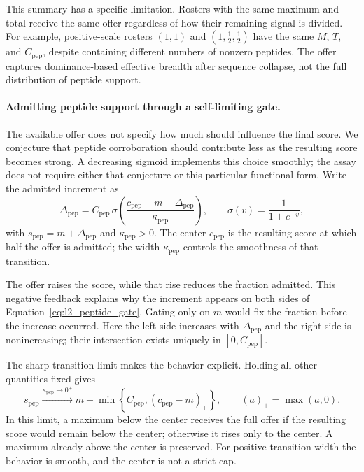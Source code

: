 \documentclass[11pt]{article}
\begin{document}
This summary has a specific limitation. Rosters with the same maximum and
total receive the same offer regardless of how their remaining signal is
divided. For example, positive-scale rosters \((1,1)\) and
\((1,\tfrac12,\tfrac12)\) have the same \(M\), \(T\), and
\(C_{\mathrm{pep}}\), despite containing different numbers of nonzero
peptides. The offer captures dominance-based effective breadth after
sequence collapse, not the full distribution of peptide support.

\paragraph{Admitting peptide support through a self-limiting gate.}
The available offer does not specify how much should influence the final
score. We conjecture that peptide corroboration should contribute less as
the resulting score becomes strong. A decreasing sigmoid implements this
choice smoothly; the assay does not require either that conjecture or this
particular functional form. Write the admitted increment as
\begin{equation}
\Delta_{\mathrm{pep}}
=C_{\mathrm{pep}}\,
\sigma\!\left(\frac{c_{\mathrm{pep}}-m-\Delta_{\mathrm{pep}}}
{\kappa_{\mathrm{pep}}}\right),
\qquad \sigma(v)=\frac{1}{1+e^{-v}},
\label{eq:l2_peptide_gate}
\end{equation}
with \(s_{\mathrm{pep}}=m+\Delta_{\mathrm{pep}}\) and
\(\kappa_{\mathrm{pep}}>0\). The center \(c_{\mathrm{pep}}\) is the
resulting score at which half the offer is admitted; the width
\(\kappa_{\mathrm{pep}}\) controls the smoothness of that transition.

The offer raises the score, while that rise reduces the fraction admitted.
This negative feedback explains why the increment appears on both sides of
Equation~\ref{eq:l2_peptide_gate}. Gating only on \(m\) would fix the
fraction before the increase occurred. Here the left side increases with
\(\Delta_{\mathrm{pep}}\) and the right side is nonincreasing; their
intersection exists uniquely in \([0,C_{\mathrm{pep}}]\).

The sharp-transition limit makes the behavior explicit. Holding all other
quantities fixed gives
\[
s_{\mathrm{pep}}\xrightarrow{\kappa_{\mathrm{pep}}\to0^+}
m+\min\!\left\{C_{\mathrm{pep}},(c_{\mathrm{pep}}-m)_+\right\},
\qquad (a)_+=\max(a,0).
\]
In this limit, a maximum below the center receives the full offer if the
resulting score would remain below the center; otherwise it rises only to
the center. A maximum already above the center is preserved. For positive
transition width the behavior is smooth, and the center is not a strict cap.
\end{document}
